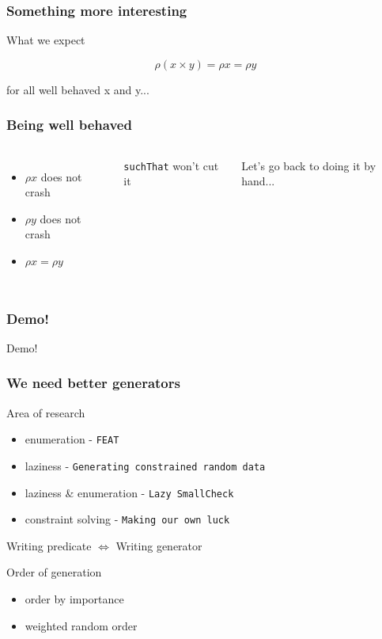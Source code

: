 \documentclass{beamer}
\begin{document}
\begin{frame}
    \frametitle{Something more interesting}
        \centerline{What we expect}
        \begin{equation*}
            \rho (x \times y) = \rho x = \rho y
        \end{equation*}
        \centerline{}
        \centerline{for all well behaved x and y...}
\end{frame}

\begin{frame}
    \frametitle{Being well behaved}
        \begin{columns}
                \begin{itemize}
                    \item $\rho x$ does not crash
                    \item $\rho y$ does not crash
                    \item $\rho x = \rho y$
                \end{itemize}
                \pause
                \centerline{\texttt{suchThat} won't cut it}
                \centerline{}
                \centerline{Let's go back to doing it by hand...}
        \end{columns}
\end{frame}

\begin{frame}
    \frametitle{Demo!}
        \Huge{\centerline{Demo!}}
\end{frame}

\begin{frame}
    \frametitle{We need better generators}
        Area of research
        \begin{itemize}
            \item enumeration - \texttt{FEAT}
            \item laziness - \texttt{Generating constrained random data}
            \item laziness \& enumeration - \texttt{Lazy SmallCheck}
            \item constraint solving - \texttt{Making our own luck}
        \end{itemize}
        Writing predicate $\iff$ Writing generator\\
        \centerline{}
        Order of generation
        \begin{itemize}
            \item order by importance
            \item weighted random order
        \end{itemize}
\end{frame}
\end{document}
